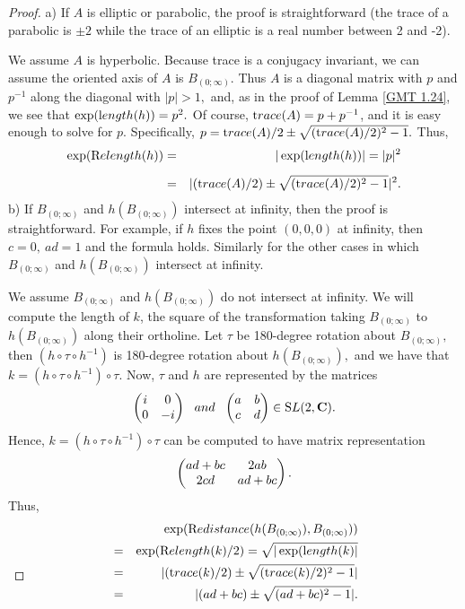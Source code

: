 \begin{proof}{}  a)  If $A$ is elliptic or parabolic, the proof is straightforward (the trace of a parabolic is $\pm 2$ while the trace of an elliptic
is a real number between 2 and -2).  

We assume $A$ is hyperbolic.  Because trace is a conjugacy invariant, we can assume the oriented axis of $A$ is $ B_{(0;\infty)}.$  Thus $A$ is a diagonal matrix with $p$ and $p^{-1}$ along the diagonal with 
$|p| > 1,$ and, as in the proof of Lemma \ref{GMT 1.24}, we see that 
$\exp({\textrm length}(h)) = p^2.$  Of course,  ${\textrm trace}(A)= p + p^{-1}$, and it is easy enough to solve for $p.$   Specifically, 
$p = {\textrm trace}(A)/2 \pm \sqrt{({\textrm trace}(A)/2)^2 - 1}.$
Thus, 
\begin{eqnarray*}
\exp({\textrm Relength} (h))& =& |\exp({\textrm length}(h))|  = 
|p|^2\\[5pt]
&=& |({\textrm trace}(A)/2) \pm \sqrt{({\textrm trace}(A)/2)^2 - 1}|^2.
\end{eqnarray*}
b)  If $ B_{(0;\infty)}$ and $h(B_{(0;\infty)})$ intersect at infinity, then the proof is straightforward.  For example, 
if $h$ fixes the point $(0,0,0)$ at infinity, then $c = 0,\ ad = 1$ and the formula holds.  Similarly for the other cases in which $ B_{(0;\infty)}$ and $h(B_{(0;\infty)})$ intersect at infinity.

We assume $ B_{(0;\infty)}$ and $h(B_{(0;\infty)})$ do not intersect at infinity. We will compute the length of $k$, the square of the transformation taking $ B_{(0;\infty)}$ to $h(B_{(0;\infty)})$ along their ortholine. 
Let $\tau$ be 180-degree rotation about $ B_{(0;\infty)},$ then $(h \circ \tau \circ h^{-1})$ is 180-degree rotation about $h(B_{(0;\infty)}),$ and
we have that  $k = (h \circ \tau \circ h^{-1}) \circ \tau.$   
Now, $\tau$ and $h$ are represented by the matrices 
$$ \left(\begin{matrix} i & 0 \cr 
0  & -i \cr\end{matrix} \right) {\mathrm \ \ and\ \ } 
                         \left(\begin{matrix} a & b \cr 
			 c  & d \cr\end{matrix} \right)  \in {\mathrm SL}(2,{\mathbf C}).$$ 
Hence,   $k = (h \circ \tau \circ h^{-1}) \circ \tau$ can be computed to have matrix
representation $$\left(\begin{matrix} ad + bc & 2ab \cr 
2cd & ad + bc \cr\end{matrix} \right).$$ 
Thus,
\begin{eqnarray*}
&&\hskip-66pt\exp({\textrm Redistance} (h(B_{(0;\infty)}), B_{(0;\infty)}))\\
& = &
\exp(\Relength(k)/2)= \sqrt{|\exp(\length(k)|}\\
& =&
|(\trace(k)/2) \pm \sqrt{(\trace(k)/2)^2 - 1}|\\
& =&
|(ad + bc) \pm \sqrt{(ad + bc)^2 - 1}|. \\
\noalign{\vskip-36pt}
\end{eqnarray*}
\end{proof}

